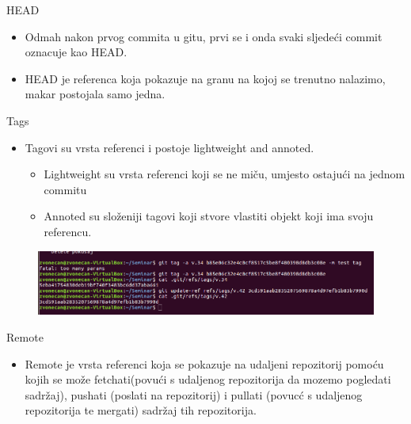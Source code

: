 \documentclass{beamer}
\begin{document}
\begin{frame}{HEAD}
	\begin{itemize}
	\item Odmah nakon prvog commita u gitu, prvi se i onda svaki sljedeći commit oznacuje kao HEAD.
	\item HEAD je referenca koja pokazuje na granu na kojoj se trenutno nalazimo, makar postojala samo jedna.
	\end{itemize}
\end{frame}
\begin{frame}{Tags}
	\begin{itemize}
	\item Tagovi su vrsta referenci i postoje lightweight and annoted.
	\begin{itemize}
	\item Lightweight su vrsta referenci koji se ne miču, umjesto ostajući na jednom commitu
	\item Annoted su složeniji tagovi koji stvore vlastiti objekt koji ima svoju referencu.
	\end{itemize}
	\end{itemize}
\end{frame}
\begin{frame}
	\begin{figure}
	\includegraphics[width=1\textwidth]{./slike/tag.png}
	\end{figure}
\end{frame}
\begin{frame}{Remote}
	\begin{itemize}
	\item Remote je vrsta referenci koja se pokazuje na udaljeni repozitorij pomoću kojih se može fetchati(povući s udaljenog repozitorija da mozemo pogledati sadržaj), pushati (poslati na repozitorij) i pullati (povucć s udaljenog repozitorija te mergati) sadržaj tih repozitorija.  
	\end{itemize}
\end{frame}
\end{document}
